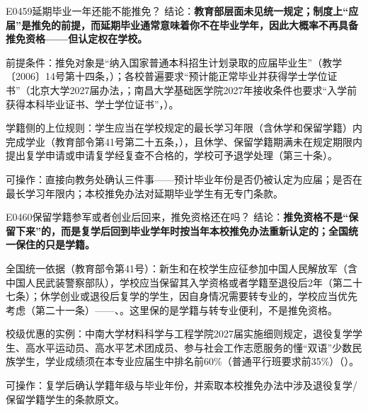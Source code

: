 \begin{qa}{E0459}{延期毕业一年还能不能推免？}
结论：\textbf{教育部层面未见统一规定；制度上“应届”是推免的前提，而延期毕业通常意味着你不在毕业学年，因此大概率不再具备推免资格——但认定权在学校。}

前提条件：推免对象是“纳入国家普通本科招生计划录取的应届毕业生”（教学〔2006〕14号第十四条，）；各校普遍要求“预计能正常毕业并获得学士学位证书”（北京大学2027届办法，；南昌大学基础医学院2027年接收条件也要求“入学前获得本科毕业证书、学士学位证书”，）。

学籍侧的上位规则：学生应当在学校规定的最长学习年限（含休学和保留学籍）内完成学业（教育部令第41号第二十五条，），且休学、保留学籍期满未在规定期限内提出复学申请或申请复学经复查不合格的，学校可予退学处理（第三十条）。

可操作：直接向教务处确认三件事——预计毕业年份是否仍被认定为应届；是否在最长学习年限内；本校推免办法对延期毕业学生有无专门条款。
\end{qa}

\begin{qa}{E0460}{保留学籍参军或者创业后回来，推免资格还在吗？}
结论：\textbf{推免资格不是“保留下来”的，而是复学后回到毕业学年时按当年本校推免办法重新认定的；全国统一保住的只是学籍。}

全国统一依据（教育部令第41号）：新生和在校学生应征参加中国人民解放军（含中国人民武装警察部队），学校应当保留其入学资格或者学籍至退役后2年（第二十七条）；休学创业或退役后复学的学生，因自身情况需要转专业的，学校应当优先考虑（第二十一条）——、。这里保的是学籍与转专业便利，不是推免资格。

校级优惠的实例：中南大学材料科学与工程学院2027届实施细则规定，退役复学学生、高水平运动员、高水平艺术团成员、参与社会工作志愿服务的懂“双语”少数民族学生，学业成绩须在本专业应届生中排名前60\%（普通平行班要求前35\%）（）。

可操作：复学后确认学籍年级与毕业年份，并索取本校推免办法中涉及退役复学/保留学籍学生的条款原文。
\end{qa}

